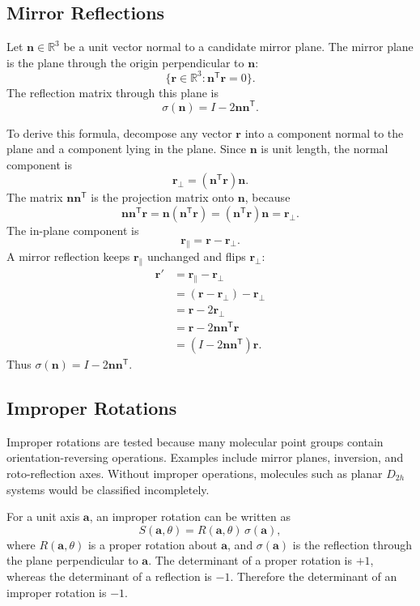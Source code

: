 \documentclass[11pt]{article}
\newcommand{\R}{\mathbb{R}}
\newcommand{\T}{\mathsf{T}}
\begin{document}
\subsection{Mirror Reflections}

Let \(\mathbf n\in\R^3\) be a unit vector normal to a candidate mirror plane.
The mirror plane is the plane through the origin perpendicular to \(\mathbf n\):
\[
    \{\mathbf r\in\R^3 : \mathbf n^{\T}\mathbf r=0\}.
\]
The reflection matrix through this plane is
\[
    \sigma(\mathbf n)
    =
    I - 2\mathbf n\mathbf n^{\T}.
\]

To derive this formula, decompose any vector \(\mathbf r\) into a component
normal to the plane and a component lying in the plane.  Since \(\mathbf n\) is
unit length, the normal component is
\[
    \mathbf r_\perp
    =
    (\mathbf n^{\T}\mathbf r)\mathbf n.
\]
The matrix \(\mathbf n\mathbf n^{\T}\) is the projection matrix onto
\(\mathbf n\), because
\[
    \mathbf n\mathbf n^{\T}\mathbf r
    =
    \mathbf n(\mathbf n^{\T}\mathbf r)
    =
    (\mathbf n^{\T}\mathbf r)\mathbf n
    =
    \mathbf r_\perp.
\]
The in-plane component is
\[
    \mathbf r_\parallel
    =
    \mathbf r-\mathbf r_\perp.
\]
A mirror reflection keeps \(\mathbf r_\parallel\) unchanged and flips
\(\mathbf r_\perp\):
\[
\begin{aligned}
    \mathbf r'
    &=
    \mathbf r_\parallel - \mathbf r_\perp\\
    &=
    (\mathbf r-\mathbf r_\perp)-\mathbf r_\perp\\
    &=
    \mathbf r-2\mathbf r_\perp\\
    &=
    \mathbf r - 2\mathbf n\mathbf n^{\T}\mathbf r\\
    &=
    (I-2\mathbf n\mathbf n^{\T})\mathbf r.
\end{aligned}
\]
Thus \(\sigma(\mathbf n)=I-2\mathbf n\mathbf n^{\T}\).

\subsection{Improper Rotations}

Improper rotations are tested because many molecular point groups contain
orientation-reversing operations.  Examples include mirror planes, inversion,
and roto-reflection axes.  Without improper operations, molecules such as planar
\(D_{2h}\) systems would be classified incompletely.

For a unit axis \(\mathbf a\), an improper rotation can be written as
\[
    S(\mathbf a,\theta)
    =
    R(\mathbf a,\theta)\,\sigma(\mathbf a),
\]
where \(R(\mathbf a,\theta)\) is a proper rotation about \(\mathbf a\), and
\(\sigma(\mathbf a)\) is the reflection through the plane perpendicular to
\(\mathbf a\).  The determinant of a proper rotation is \(+1\), whereas the
determinant of a reflection is \(-1\).  Therefore the determinant of an
improper rotation is \(-1\).
\end{document}
